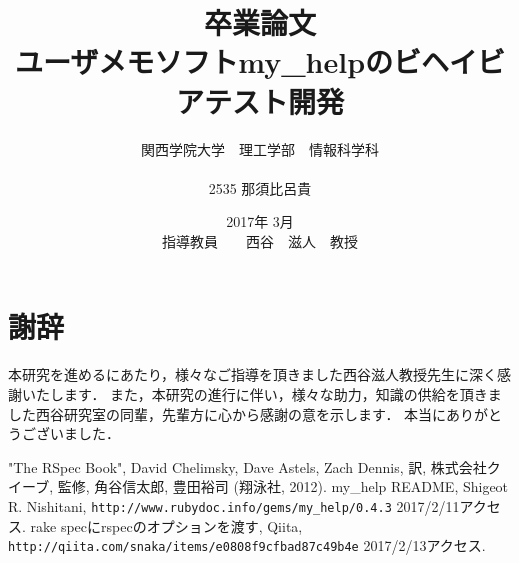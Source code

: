 \documentclass[12pt,a4paper]{jsarticle}
\begin{document}
\title{卒業論文\\
\vspace{4cm} ユーザメモソフトmy\_helpのビヘイビアテスト開発}
\author{ 関西学院大学　理工学部　情報科学科\\\\2535 那須比呂貴}
\date{\vspace{3cm} 2017年  3月\\
\vspace{3cm} 指導教員　　西谷　滋人　教授}
\maketitle
\setcounter{tocdepth}{4}
\tableofcontents









\section{謝辞}
本研究を進めるにあたり，様々なご指導を頂きました西谷滋人教授先生に深く感謝いたします．
また，本研究の進行に伴い，様々な助力，知識の供給を頂きました西谷研究室の同輩，先輩方に心から感謝の意を示します．
本当にありがとうございました．

\begin{flushleft}
\begin{thebibliography}{99}
   "The RSpec Book", David Chelimsky, Dave Astels, Zach Dennis, 訳, 株式会社クイーブ, 監修, 角谷信太郎, 豊田裕司 (翔泳社, 2012).
   my\_help README, Shigeot R. Nishitani, \verb|http://www.rubydoc.info/gems/my_help/0.4.3| 2017/2/11アクセス.
   rake specにrspecのオプションを渡す, Qiita, \verb|http://qiita.com/snaka/items/e0808f9cfbad87c49b4e| 2017/2/13アクセス.
\end{thebibliography}
\end{flushleft}
\end{document}

